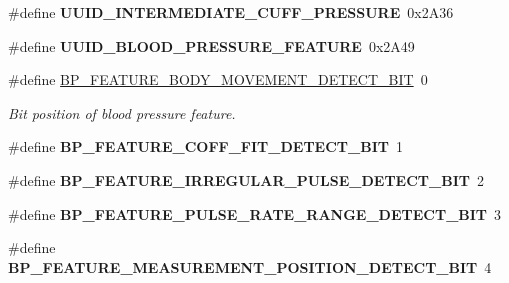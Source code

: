 \begin{DoxyCompactItemize}
\item 
\#define {\bfseries U\+U\+I\+D\+\_\+\+I\+N\+T\+E\+R\+M\+E\+D\+I\+A\+T\+E\+\_\+\+C\+U\+F\+F\+\_\+\+P\+R\+E\+S\+S\+U\+RE}~0x2\+A36\hypertarget{group___b_l_e___b_p_s_ga55f0edc9b1c0f5ab6accf04baac1c639}{}\label{group___b_l_e___b_p_s_ga55f0edc9b1c0f5ab6accf04baac1c639}

\item 
\#define {\bfseries U\+U\+I\+D\+\_\+\+B\+L\+O\+O\+D\+\_\+\+P\+R\+E\+S\+S\+U\+R\+E\+\_\+\+F\+E\+A\+T\+U\+RE}~0x2\+A49\hypertarget{group___b_l_e___b_p_s_ga118411d2112eabe4c3b5f9115eeb77e6}{}\label{group___b_l_e___b_p_s_ga118411d2112eabe4c3b5f9115eeb77e6}

\item 
\#define \hyperlink{group___b_l_e___b_p_s_gaa1bf6cf39fa83f7de6cfc0b845a13b46}{B\+P\+\_\+\+F\+E\+A\+T\+U\+R\+E\+\_\+\+B\+O\+D\+Y\+\_\+\+M\+O\+V\+E\+M\+E\+N\+T\+\_\+\+D\+E\+T\+E\+C\+T\+\_\+\+B\+IT}~0\hypertarget{group___b_l_e___b_p_s_gaa1bf6cf39fa83f7de6cfc0b845a13b46}{}\label{group___b_l_e___b_p_s_gaa1bf6cf39fa83f7de6cfc0b845a13b46}

\begin{DoxyCompactList}\small\item\em Bit position of blood pressure feature. \end{DoxyCompactList}\item 
\#define {\bfseries B\+P\+\_\+\+F\+E\+A\+T\+U\+R\+E\+\_\+\+C\+O\+F\+F\+\_\+\+F\+I\+T\+\_\+\+D\+E\+T\+E\+C\+T\+\_\+\+B\+IT}~1\hypertarget{group___b_l_e___b_p_s_ga25585816157ac3e08fde7c1bf0023ce8}{}\label{group___b_l_e___b_p_s_ga25585816157ac3e08fde7c1bf0023ce8}

\item 
\#define {\bfseries B\+P\+\_\+\+F\+E\+A\+T\+U\+R\+E\+\_\+\+I\+R\+R\+E\+G\+U\+L\+A\+R\+\_\+\+P\+U\+L\+S\+E\+\_\+\+D\+E\+T\+E\+C\+T\+\_\+\+B\+IT}~2\hypertarget{group___b_l_e___b_p_s_ga500a503dfc7f0f19bf4c452d89472903}{}\label{group___b_l_e___b_p_s_ga500a503dfc7f0f19bf4c452d89472903}

\item 
\#define {\bfseries B\+P\+\_\+\+F\+E\+A\+T\+U\+R\+E\+\_\+\+P\+U\+L\+S\+E\+\_\+\+R\+A\+T\+E\+\_\+\+R\+A\+N\+G\+E\+\_\+\+D\+E\+T\+E\+C\+T\+\_\+\+B\+IT}~3\hypertarget{group___b_l_e___b_p_s_gad46f021ea34e5ea5b639fc3407f8ba1a}{}\label{group___b_l_e___b_p_s_gad46f021ea34e5ea5b639fc3407f8ba1a}

\item 
\#define {\bfseries B\+P\+\_\+\+F\+E\+A\+T\+U\+R\+E\+\_\+\+M\+E\+A\+S\+U\+R\+E\+M\+E\+N\+T\+\_\+\+P\+O\+S\+I\+T\+I\+O\+N\+\_\+\+D\+E\+T\+E\+C\+T\+\_\+\+B\+IT}~4\hypertarget{group___b_l_e___b_p_s_ga27199617c5fef5d263cc2eaa1055a151}{}\label{group___b_l_e___b_p_s_ga27199617c5fef5d263cc2eaa1055a151}


\end{DoxyCompactItemize}
